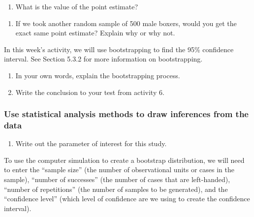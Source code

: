 \documentclass[
]{report}
\providecommand{\tightlist}{%
  \setlength{\itemsep}{0pt}\setlength{\parskip}{0pt}}
\begin{document}
\begin{enumerate}
\def\labelenumi{\arabic{enumi}.}
\tightlist
\item
  What is the value of the point estimate?
\end{enumerate}

\vspace{0.5in}

\begin{enumerate}
\def\labelenumi{\arabic{enumi}.}
\setcounter{enumi}{1}
\tightlist
\item
  If we took another random sample of 500 male boxers, would you get the exact same point estimate? Explain why or why not.
\end{enumerate}

\vspace{0.5in}

In this week's activity, we will use bootstrapping to find the 95\% confidence interval. See Section 5.3.2 for more information on bootstrapping.

\begin{enumerate}
\def\labelenumi{\arabic{enumi}.}
\setcounter{enumi}{2}
\item
  In your own words, explain the bootstrapping process.
  \vspace{0.5in}
\item
  Write the conclusion to your test from activity 6.
\end{enumerate}

\vspace{0.5in}

\hypertarget{use-statistical-analysis-methods-to-draw-inferences-from-the-data-1}{%
\subsubsection*{Use statistical analysis methods to draw inferences from the data}\label{use-statistical-analysis-methods-to-draw-inferences-from-the-data-1}}

\begin{enumerate}
\def\labelenumi{\arabic{enumi}.}
\setcounter{enumi}{4}
\tightlist
\item
  Write out the parameter of interest for this study.
\end{enumerate}

\vspace{0.5in}

To use the computer simulation to create a bootstrap distribution, we will need to enter the ``sample size'' (the number of observational units or cases in the sample), ``number of successes'' (the number of cases that are left-handed), ``number of repetitions'' (the number of samples to be generated), and the ``confidence level'' (which level of confidence are we using to create the confidence interval).
\end{document}
